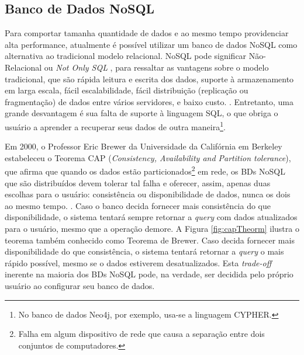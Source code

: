 %
%

\subsection{Banco de Dados NoSQL}

\indent Para comportar tamanha quantidade de dados e ao mesmo tempo providenciar alta performance, atualmente é possível utilizar um banco de dados NoSQL como alternativa ao tradicional modelo relacional. NoSQL pode significar Não-Relacional ou \textit{Not Only SQL}  \cite{cattell11}, para ressaltar as vantagens sobre o modelo tradicional, que são rápida leitura e escrita dos dados, suporte à armazenamento em larga escala, fácil escalabilidade, fácil distribuição (replicação ou fragmentação) de dados entre vários servidores, e baixo custo. \cite{jing12}. Entretanto, uma grande desvantagem é sua falta de suporte à linguagem SQL, o que obriga o usuário a aprender a recuperar seus dados de outra maneira\footnote{No banco de dados Neo4j, por exemplo, usa-se a linguagem CYPHER.}. 

\indent Em 2000, o Professor Eric Brewer da Universidade da Califórnia em Berkeley estabeleceu o Teorema CAP (\textit{Consistency, Availability and Partition tolerance}), que afirma que quando os dados estão particionados\footnote{Falha em algum dispositivo de rede que causa a separação entre dois conjuntos de computadores.} em rede, os BDs NoSQL que são distribuídos devem tolerar tal falha e oferecer, assim, apenas duas escolhas para o usuário: consistência ou disponibilidade de dados, nunca os dois ao mesmo tempo. \cite{jing12} \cite{cattell11}. Caso o banco decida fornecer mais consistência do que disponibilidade, o sistema tentará sempre retornar a \textit{query} com dados atualizados para o usuário, mesmo que a operação demore. A Figura \ref{fig:capTheorm} ilustra o teorema também conhecido como Teorema de Brewer. Caso decida fornecer mais disponibilidade do que consistência, o sistema tentará retornar a \textit{query} o mais rápido possível, mesmo se o dados estiverem desatualizados. Esta \textit{trade-off} inerente na maioria dos BDs NoSQL pode, na verdade, ser decidida pelo próprio usuário ao configurar seu banco de dados. 

